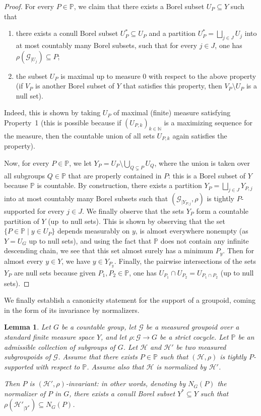 \documentclass[JEP,XML,SOM,Unicode,NoFloatCountersInSection,published]{cedram}
\let\mathcal\mathscr
\theoremstyle{plain}
\newtheorem{lemma}[theo]{Lemma}
\theoremstyle{definition}
\let\Dunion\bigsqcup
\newcommand{\calg}{\mathcal{G}}
\newcommand{\calh}{\mathcal{H}}
\begin{document}
\begin{proof}
For every $P\in\mathbb{P}$, we claim that there exists a Borel subset $U_P\subseteq Y$ such that
\begin{enumerate}
\item there exists a conull Borel subset $U_P^*\subseteq U_P$ and a partition $U_P^*=\Dunion_{j\in J} U_j$ into at most countably many Borel subsets, such that for every $j\in J$, one has $\rho(\calg_{|U_j})\subseteq P$;
\item the subset $U_P$ is maximal up to measure $0$ with respect to the above property (\ie if $V_P$ is another Borel subset of $Y$ that satisfies this property, then $V_P\setminus U_P$ is a null set).
\end{enumerate}
Indeed, this is shown by taking $U_P$ of maximal (finite) measure satisfying Property~1 (this is possible because if $(U_{P,k})_{k\in\mathbb{N}}$ is a maximizing sequence for the measure, then the countable union of all sets $U_{P,k}$ again satisfies the property).

Now, for every $P\in\mathbb{P}$, we let $Y_P=U_P\setminus\bigcup_{Q\subsetneq P} U_Q$, where the union is taken over all subgroups $Q\in\mathbb{P}$ that are properly contained in $P$: this is a Borel subset of $Y$ because $\mathbb{P}$ is countable. By construction, there exists a partition $Y_P=\Dunion_{j\in J}Y_{P,j}$ into at most countably many Borel subsets such that $(\calg_{|Y_{P,j}},\rho)$ is tightly $P$-supported for every $j\in J$. We finally observe that the sets $Y_P$ form a countable partition of $Y$ (up~to null sets). This is shown by observing that the set $\{P\in\mathbb{P}\mid y\in U_P\}$ depends measurably on $y$, is almost everywhere nonempty (as $Y=U_G$ up to null sets), and using the fact that $\mathbb{P}$ does not contain any infinite descending chain, we see that this set almost surely has a minimum $P_y$. Then for almost every $y\in Y$, we have $y\in Y_{P_y}$. Finally, the pairwise intersections of the sets $Y_P$ are null sets because given $P_1,P_2\in\mathbb{P}$, one has $U_{P_1}\cap U_{P_2}=U_{P_1\cap P_2}$ (up to null sets).
\end{proof}

We finally establish a canonicity statement for the support of a groupoid, coming in the form of its invariance by normalizers.

\begin{lemma}\label{lemma:support-invariant-normal}
Let $G$ be a countable group, let $\calg$ be a measured groupoid over a standard finite measure space $Y$, and let $\rho:\calg\to G$ be a strict cocycle. Let $\mathbb{P}$ be an admissible collection of subgroups of $G$. Let $\calh$ and $\calh'$ be two measured subgroupoids of $\calg$. Assume that there exists $P\in\mathbb{P}$ such that $(\calh,\rho)$ is tightly $P$-supported with respect to $\mathbb{P}$. Assume also that $\calh$ is normalized by $\calh'$.

Then $P$ is $(\calh',\rho)$-invariant: in other words, denoting by $N_G(P)$ the normalizer of $P$ in $G$, there exists a conull Borel subset $Y^*\subseteq Y$ such that $\rho(\calh'_{|Y^*})\subseteq N_G(P)$.
\end{lemma}
\end{document}
